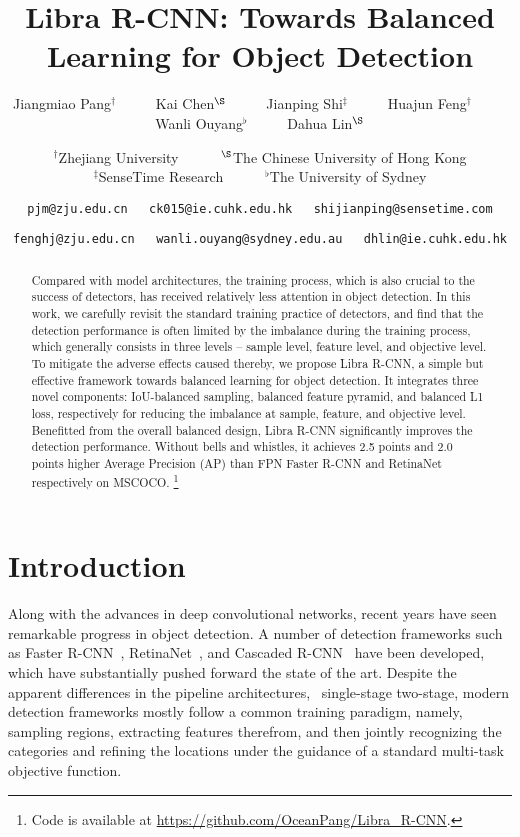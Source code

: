 \documentclass[10pt,twocolumn,letterpaper]{article}
\begin{document}
\title{Libra R-CNN: Towards Balanced Learning for Object Detection}
\author{
Jiangmiao Pang$^{\dag}$~~~~~
Kai Chen$^{\S}$~~~~~
Jianping Shi$^{\ddagger}$~~~~~
Huajun Feng$^{\dag}$~~~~~
Wanli Ouyang$^{\flat}$~~~~~
Dahua Lin$^{\S}$
\\
\and
$^{\dag}$Zhejiang University~~~~~~$^{\S}$The Chinese University of Hong Kong\\
$^{\ddagger}$SenseTime Research~~~~~~$^{\flat}$The University of Sydney\\
\and
{\tt\small pjm@zju.edu.cn~~~ck015@ie.cuhk.edu.hk~~~shijianping@sensetime.com}
\and
{\tt\small fenghj@zju.edu.cn~~~wanli.ouyang@sydney.edu.au~~~dhlin@ie.cuhk.edu.hk}
}
\maketitle
\thispagestyle{empty}



\begin{abstract}
Compared with model architectures, the training process, which is also
crucial to the success of detectors,
has received relatively less attention in object detection.
In this work, we carefully revisit the standard training practice of detectors,
and find that the detection performance is often limited by the imbalance
during the training process, which generally consists in three levels --
sample level, feature level, and objective level.
To mitigate the adverse effects caused thereby, we propose
Libra R-CNN, a simple but effective framework towards balanced learning for object detection.
It integrates three novel components:
IoU-balanced sampling, balanced feature pyramid, and balanced L1 loss,
respectively for reducing the imbalance at sample, feature, and objective level.
Benefitted from the overall balanced design, Libra R-CNN significantly improves the detection performance.
Without bells and whistles, it achieves 2.5 points and 2.0 points higher Average Precision (AP) than FPN
Faster R-CNN and RetinaNet respectively on MSCOCO.
\footnote{Code is available at \url{https://github.com/OceanPang/Libra_R-CNN}.}
\end{abstract}
 

\section{Introduction}

Along with the advances in deep convolutional networks, recent years have
seen remarkable progress in object detection.
A number of detection frameworks such as
Faster R-CNN~\cite{frcnn},
RetinaNet~\cite{focalloss},
and Cascaded R-CNN~\cite{cascadercnn} have been developed,
which have substantially pushed forward the state of the art.
Despite the apparent differences in the pipeline architectures,
\eg~single-stage \vs two-stage, modern detection frameworks mostly follow
a common training paradigm, namely, sampling regions, extracting features therefrom,
and then jointly recognizing the categories and refining the locations
under the guidance of a standard multi-task objective function.
\end{document}
